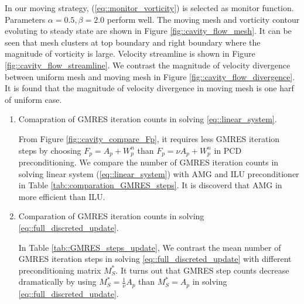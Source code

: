 \documentclass{eajam}
\begin{document}
       In our moving strategy, (\ref{eq::monitor_vorticity}) is
       selected as monitor function. Parameters $\alpha = 0.5, \beta =
       2.0$ perform well. The moving mesh and vorticity contour
       evoluting to steady state are shown in Figure
       \ref{fig::cavity_flow_mesh}. It can be seen that mesh clusters
       at top boundary and right boundary where the magnitude of
       vorticity is large. Velocity streamline is shown in Figure
       \ref{fig::cavity_flow_streamline}. We contrast the magnitude of
       velocity divergence between uniform mesh and moving mesh in
       Figure \ref{fig::cavity_flow_divergence}. It is found that the
       magnitude of velocity divergence in moving mesh is one harf of
       uniform case.
       \begin{enumerate}
         \item Comapration of GMRES iteration counts in solving
           \eqref{eq::linear_system}.
           
         From Figure \ref{fig::cavity_compare_Fp}, it requires less GMRES
         iteration steps by choosing $F_p = A_p + W_p^n$ than $F_p = \nu
         A_p + W_p^n$ in PCD preconditioning. We compare the number of
         GMRES iteration counts in solving linear system
         (\ref{eq::linear_system}) with AMG and ILU preconditioner in
         Table \ref{tab::comparation_GMRES_steps}. It is discoverd that
         AMG in more efficient than ILU. 
         \item Comparation of GMRES iteration counts in solving
           \eqref{eq::full_discreted_update}.

         In Table \ref{tab::GMRES_steps_update}, We contrast the mean
         number of GMRES iteration steps in solving
         \eqref{eq::full_discreted_update} with different preconditioning
         matrix $M_S^*$. It turns out that GMRES step counts decrease
         dramatically by using $M_S^* = \frac{1}{\nu} A_p$ than $M_S^* = A_p$ in
         solving \eqref{eq::full_discreted_update}.
       \end{enumerate}
       
\end{document}
